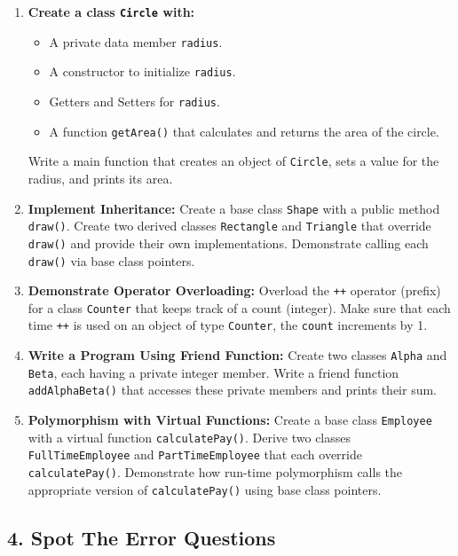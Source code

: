 \documentclass[a4paper,12pt]{article}
\begin{document}
\begin{enumerate}
    \item \textbf{Create a class \texttt{Circle} with:}
    \begin{itemize}
        \item A private data member \texttt{radius}.
        \item A constructor to initialize \texttt{radius}.
        \item Getters and Setters for \texttt{radius}.
        \item A function \texttt{getArea()} that calculates and returns the area of the circle.
    \end{itemize}
    Write a main function that creates an object of \texttt{Circle}, sets a value for the radius, and prints its area.

    \item \textbf{Implement Inheritance:} 
    Create a base class \texttt{Shape} with a public method \texttt{draw()}. Create two derived classes \texttt{Rectangle} and \texttt{Triangle} that override \texttt{draw()} and provide their own implementations. Demonstrate calling each \texttt{draw()} via base class pointers.

    \item \textbf{Demonstrate Operator Overloading:} 
    Overload the \texttt{++} operator (prefix) for a class \texttt{Counter} that keeps track of a count (integer). Make sure that each time \texttt{++} is used on an object of type \texttt{Counter}, the \texttt{count} increments by 1.

    \item \textbf{Write a Program Using Friend Function:} 
    Create two classes \texttt{Alpha} and \texttt{Beta}, each having a private integer member. Write a friend function \texttt{addAlphaBeta()} that accesses these private members and prints their sum.

    \item \textbf{Polymorphism with Virtual Functions:} 
    Create a base class \texttt{Employee} with a virtual function \texttt{calculatePay()}. Derive two classes \texttt{FullTimeEmployee} and \texttt{PartTimeEmployee} that each override \texttt{calculatePay()}. Demonstrate how run-time polymorphism calls the appropriate version of \texttt{calculatePay()} using base class pointers.
\end{enumerate}

\subsection{4. Spot The Error Questions}
\end{document}
